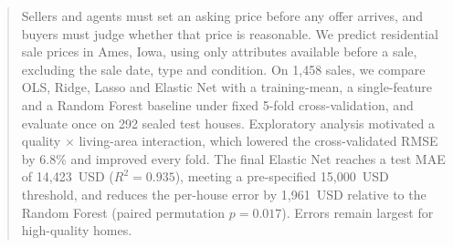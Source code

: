 \begin{abstract}
Sellers and agents must set an asking price before any offer arrives, and buyers must judge whether that price is reasonable.
We predict residential sale prices in Ames, Iowa, using only attributes available before a sale, excluding the sale date, type and condition.
On 1{,}458 sales, we compare OLS, Ridge, Lasso and Elastic Net with a training-mean, a single-feature and a Random Forest baseline under fixed 5-fold cross-validation, and evaluate once on 292 sealed test houses.
Exploratory analysis motivated a quality $\times$ living-area interaction, which lowered the cross-validated RMSE by 6.8\% and improved every fold.
The final Elastic Net reaches a test MAE of 14{,}423~USD ($R^2 = 0.935$), meeting a pre-specified 15{,}000~USD threshold, and reduces the per-house error by 1{,}961~USD relative to the Random Forest (paired permutation $p = 0.017$).
Errors remain largest for high-quality homes.
\end{abstract}
